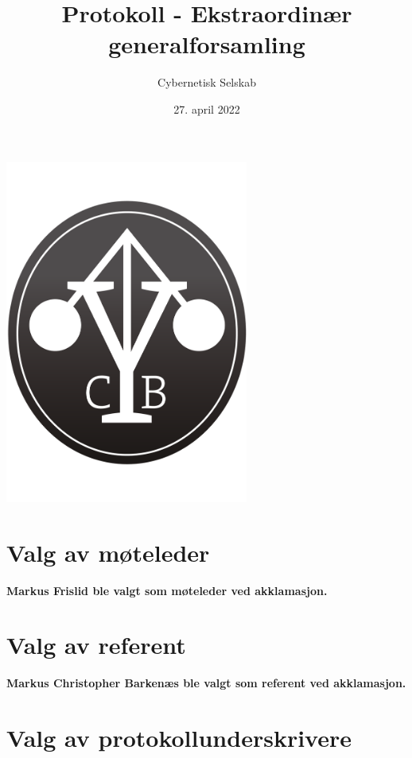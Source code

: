 \documentclass[10pt,norsk,a4paper,usenames,dvipsnames]{article}
\title{\huge Protokoll - Ekstraordinær generalforsamling}
\author{\LARGE Cybernetisk Selskab}
\date{27. april 2022}
\begin{document}
\maketitle



\begin{center}


\includegraphics[width=0.6\textwidth,height=0.6\textheight,keepaspectratio=true]{cyblogoa3.pdf}

\end{center}


\newpage


\tableofcontents

\section{Valg av møteleder}

\textbf{Markus Frislid ble valgt som møteleder ved akklamasjon.}

\section{Valg av referent}

\textbf{Markus Christopher Barkenæs ble valgt som referent ved akklamasjon.}

\section{Valg av protokollunderskrivere}
\end{document}
